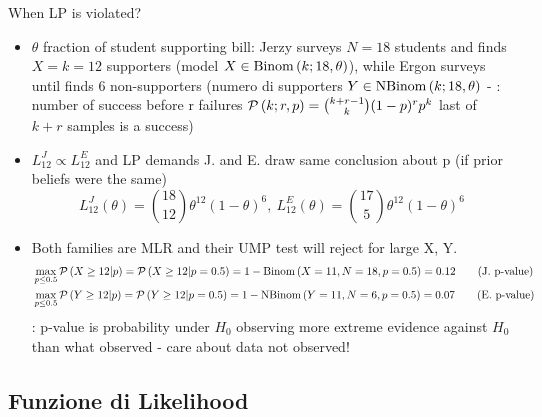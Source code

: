 \documentclass[asd-beamer.tex]{subfiles}%
\begin{document}
\begin{frame}{When LP is violated?}
\begin{itemize}
\item $\theta$ fraction of student supporting bill: Jerzy surveys $N=18$ students and finds $X=k=12$ supporters (model $X\in\operatorname{Binom}{(k;18,\theta)}$), while Ergon surveys until finds 6 non-supporters (numero di supporters $Y\in\operatorname{NBinom}{(k;18,\theta)}$ - : number of success before r failures $\operatorname{\mathcal{P}}{(k;r,p)}=\binom{k+r-1}{k}(1-p)^rp^k$ last of $k+r$ samples is a success)
\item $L^J_{12}\propto L^E_{12}$ and LP demands J. and E. draw same conclusion about p (if prior beliefs were the same)\[L^J_{12}(\theta)=\binom{18}{12}\theta^{12}(1-\theta)^6,\ L^E_{12}(\theta)=\binom{17}{5}\theta^{12}(1-\theta)^6\]
\item Both families are MLR and their UMP test will reject for large X, Y.
\begin{align*}
&\max_{p\leq0.5}\operatorname{\mathcal{P}}{(X\geq12|p)}=\operatorname{\mathcal{P}}{(X\geq12|p=0.5)}=1-\operatorname{Binom}{(X=11,N=18,p=0.5)}=0.12\tag{J. p-value}\\
&\max_{p\leq0.5}\operatorname{\mathcal{P}}{(Y\geq12|p)}=\operatorname{\mathcal{P}}{(Y\geq12|p=0.5)}=1-\operatorname{NBinom}{(Y=11,N=6,p=0.5)}=0.07\tag{E. p-value}
\end{align*}
: p-value is probability under $H_0$ observing more extreme evidence against $H_0$ than what observed - care about data not observed!
\end{itemize}
\end{frame}


\subsection{Funzione di Likelihood}
\end{document}
